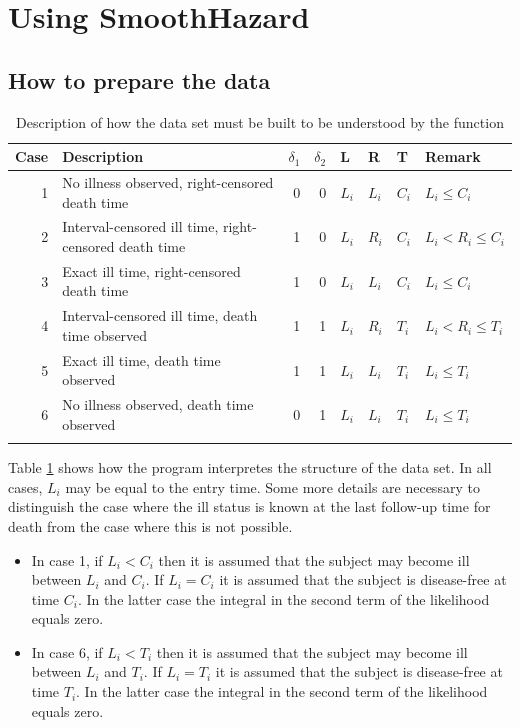 \documentclass[article]{jss}
\begin{document}
\section{Using SmoothHazard}
\label{sec-5}

\subsection{How to prepare the data}
\label{sec-5-1}
\begin{table}
\centering
\begin{tabular}{rm{18em}rrllll}
Case & Description & $\delta_1$ & $\delta_2$ & L & R & T & Remark\\
\hline
1 & No illness observed, right-censored death time & 0 & 0 & $L_i$ & $L_i$ & $C_i$ & $L_i\le C_i$\\
2 & Interval-censored ill time, right-censored death time & 1 & 0 & $L_i$ & $R_i$ & $C_i$ & $L_i<R_i\le C_i$\\
3 & Exact ill time, right-censored death time & 1 & 0 & $L_i$ & $L_i$ & $C_i$ & $L_i\le C_i$\\
4 & Interval-censored ill time, death time observed & 1 & 1 & $L_i$ & $R_i$ & $T_i$ & $L_i<R_i\le T_i$\\
5 & Exact ill time, death time observed & 1 & 1 & $L_i$ & $L_i$ & $T_i$ & $L_i\le T_i$\\
6 & No illness observed, death time observed & 0 & 1 & $L_i$ & $L_i$ & $T_i$ & $L_i\le T_i$\\
 &  &  &  &  &  &  & \\
\end{tabular}
\caption{Description of how the data set must be built to be understood by the  function}
\label{tab:XX}
\end{table}

Table \ref{tab:XX} shows how the program interpretes the structure of the data
set. In all cases, \(L_i\) may be equal to the entry time. 
Some more details are necessary to distinguish the case where the
ill status is known at the last follow-up time for death from the case where
this is not possible. 

\begin{itemize}
\item In case 1, if \(L_i<C_i\) then it is assumed that the subject may
become ill between \(L_i\) and \(C_i\). If \(L_i=C_i\) it is assumed that
the subject is disease-free at time \(C_i\). In the latter case the
integral in the second term of the likelihood equals zero.
\item In case 6, if  \(L_i<T_i\) then it is assumed that the subject may
become ill between \(L_i\) and \(T_i\). If \(L_i=T_i\) it is assumed that
the subject is disease-free at time \(T_i\). In the latter case the
integral in the second term of the likelihood equals zero.
\end{itemize}
\end{document}
